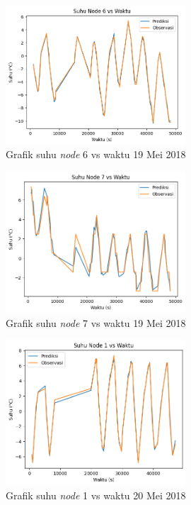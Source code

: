 \begin{figure}[H]
\setlength{}
\begin{center}
\includegraphics[width=0.6\textwidth]{fig/node6_temp_2018-05-19.png}
	\caption{Grafik suhu \textit{node} 6 vs waktu 19 Mei 2018}
\label{fig:node619}
\end{center}
\end{figure}

\begin{figure}[H]
\setlength{}
\begin{center}
\includegraphics[width=0.6\textwidth]{fig/node7_temp_2018-05-19.png}
\caption{Grafik suhu \textit{node} 7 vs waktu 19 Mei 2018}
\label{fig:node719}
\end{center}
\end{figure}

\begin{figure}[H]
\setlength{}
\begin{center}
\includegraphics[width=0.6\textwidth]{fig/node1_temp_2018-05-20.png}
\caption{Grafik suhu \textit{node} 1 vs waktu 20 Mei 2018}
\label{fig:node120}
\end{center}
\end{figure}

